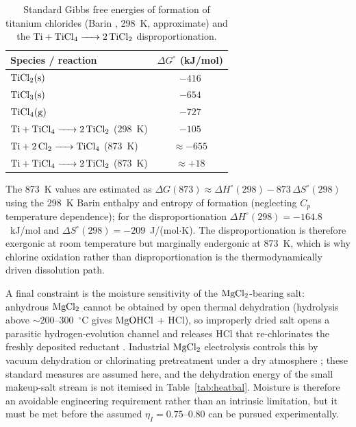 \documentclass[pdflatex,sn-basic,Numbered]{sn-jnl}
\begin{document}
\begin{table}[!ht]
\centering
\footnotesize
\caption{Standard Gibbs free energies of formation of titanium chlorides (Barin \cite{barin1995}, 298~K, approximate) and the $\ce{Ti + TiCl4 -> 2TiCl2}$ disproportionation.}
\label{tab:ticl}
\begin{tabular}{lc}
\toprule
Species / reaction & $\Delta G^{\circ}$ (kJ/mol) \\
\midrule
$\ce{TiCl2(s)}$ & $-416$ \\
$\ce{TiCl3(s)}$ & $-654$ \\
$\ce{TiCl4(g)}$ & $-727$ \\
$\ce{Ti + TiCl4 -> 2TiCl2}$ (298~K) & $-105$ \\
$\ce{Ti + 2Cl2 -> TiCl4}$ (873~K) & $\approx -655$ \\
$\ce{Ti + TiCl4 -> 2TiCl2}$ (873~K) & $\approx +18$ \\
\bottomrule
\end{tabular}

\par\footnotesize The 873~K values are estimated as $\Delta G(873) \approx \Delta H^{\circ}(298) - 873\,\Delta S^{\circ}(298)$ using the 298~K Barin enthalpy and entropy of formation (neglecting $C_p$ temperature dependence); for the disproportionation $\Delta H^{\circ}(298) = -164.8$~kJ/mol and $\Delta S^{\circ}(298) = -209$~J/(mol$\cdot$K). The disproportionation is therefore exergonic at room temperature but marginally endergonic at 873~K, which is why chlorine oxidation rather than disproportionation is the thermodynamically driven dissolution path.
\end{table}

A final constraint is the moisture sensitivity of the $\ce{MgCl2}$-bearing salt: anhydrous $\ce{MgCl2}$ cannot be obtained by open thermal dehydration (hydrolysis above $\sim$200--300~$^{\circ}$C gives $\ce{MgOHCl}$ + HCl), so improperly dried salt opens a parasitic hydrogen-evolution channel and releases HCl that re-chlorinates the freshly deposited reductant \cite{song2024}. Industrial $\ce{MgCl2}$ electrolysis controls this by vacuum dehydration or chlorinating pretreatment under a dry atmosphere \cite{pletcher1990}; these standard measures are assumed here, and the dehydration energy of the small makeup-salt stream is not itemised in Table~\ref{tab:heatbal}. Moisture is therefore an avoidable engineering requirement rather than an intrinsic limitation, but it must be met before the assumed $\eta_I = 0.75$--0.80 can be pursued experimentally.
\end{document}
